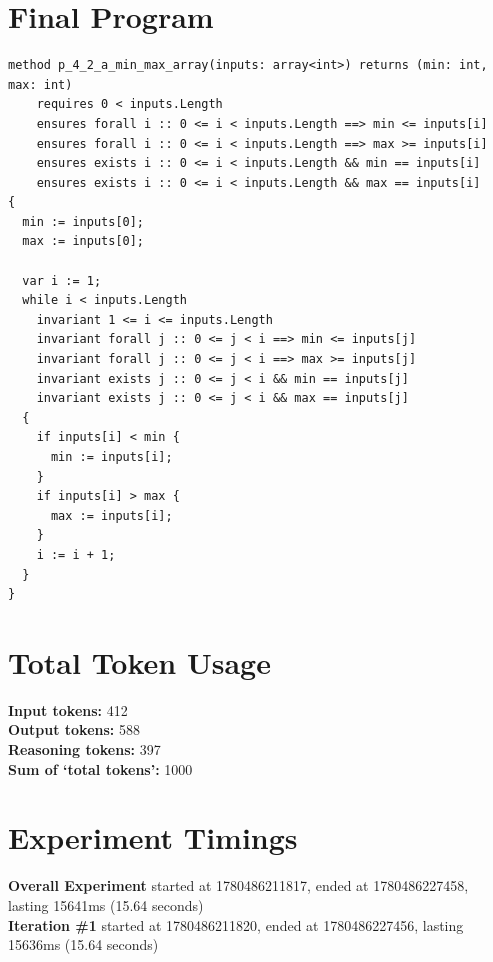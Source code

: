 \documentclass{article}
\begin{document}
\section*{Final Program}
\begin{lstlisting}
method p_4_2_a_min_max_array(inputs: array<int>) returns (min: int, max: int)
	requires 0 < inputs.Length
	ensures forall i :: 0 <= i < inputs.Length ==> min <= inputs[i]
	ensures forall i :: 0 <= i < inputs.Length ==> max >= inputs[i]
	ensures exists i :: 0 <= i < inputs.Length && min == inputs[i]
	ensures exists i :: 0 <= i < inputs.Length && max == inputs[i]
{
  min := inputs[0];
  max := inputs[0];

  var i := 1;
  while i < inputs.Length
    invariant 1 <= i <= inputs.Length
    invariant forall j :: 0 <= j < i ==> min <= inputs[j]
    invariant forall j :: 0 <= j < i ==> max >= inputs[j]
    invariant exists j :: 0 <= j < i && min == inputs[j]
    invariant exists j :: 0 <= j < i && max == inputs[j]
  {
    if inputs[i] < min {
      min := inputs[i];
    }
    if inputs[i] > max {
      max := inputs[i];
    }
    i := i + 1;
  }
}
\end{lstlisting}
\section*{Total Token Usage}
\textbf{Input tokens: }412
\\\textbf{Output tokens: }588
\\\textbf{Reasoning tokens: }397
\\\textbf{Sum of `total tokens': }1000
\section*{Experiment Timings}
\textbf{Overall Experiment} started at 1780486211817, ended at 1780486227458, lasting 15641ms (15.64 seconds)
\\\textbf{Iteration \#1} started at 1780486211820, ended at 1780486227456, lasting 15636ms (15.64 seconds)
\end{document}
